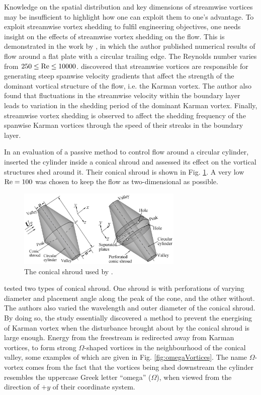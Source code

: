 \documentclass[oneside]{utmthesis}
\begin{document}
Knowledge on the spatial distribution and key dimensions of streamwise vortices may be insufficient to highlight how one can exploit them to one's advantage. To exploit streamwise vortex shedding to fulfil engineering objectives, one needs insight on the effects of streamwise vortex shedding on the flow. This is demonstrated in the work by \citet{Rai2018}, in which the author published numerical results of flow around a flat plate with a circular trailing edge. The Reynolds number varies from $250 \leq \text{Re} \leq 10000$. \citet{Rai2018} discovered that streamwise vortices are responsible for generating steep spanwise velocity gradients that affect the strength of the dominant vortical structure of the flow, i.e. the Karman vortex. The author also found that fluctuations in the streamwise velocity within the boundary layer leads to variation in the shedding period of the dominant Karman vortex. Finally, streamwise vortex shedding is observed to affect the shedding frequency of the spanwise Karman vortices through the speed of their streaks in the boundary layer.

In an evaluation of a passive method to control flow around a circular cylinder, \citet{Lin2018} inserted the cylinder inside a conical shroud and assessed its effect on the vortical structures shed around it. Their conical shroud is shown in Fig. \ref{fig:conicalShroud}. A very low $\text{Re} = 100$ was chosen to keep the flow as two-dimensional as possible.

\begin{figure}[!h]
  \centering
  \hspace{1cm} \includegraphics[width=0.7\textwidth]{figs/conicalShroud}
    \caption{The conical shroud used by \citet{Lin2018}.}
    \label{fig:conicalShroud}
  \end{figure}

  \noindent \citet{Lin2018} tested two types of conical shroud. One shroud is with perforations of varying diameter and placement angle along the peak of the cone, and the other without. The authors also varied the wavelength and outer diameter of the conical shroud. By doing so, the study essentially discovered a method to prevent the energising of Karman vortex when the disturbance brought about by the conical shroud is large enough. Energy from the freestream is redirected away from Karman vortices, to form strong $\Omega$-shaped vortices in the neighbourhood of the conical valley, some examples of which are given in Fig. \ref{fig:omegaVortices}. The name $\Omega$-vortex comes from the fact that the vortices being shed downstream the cylinder resembles the uppercase Greek letter ``omega'' ($\Omega$), when viewed from the direction of $+y$ of their coordinate system.
\end{document}
